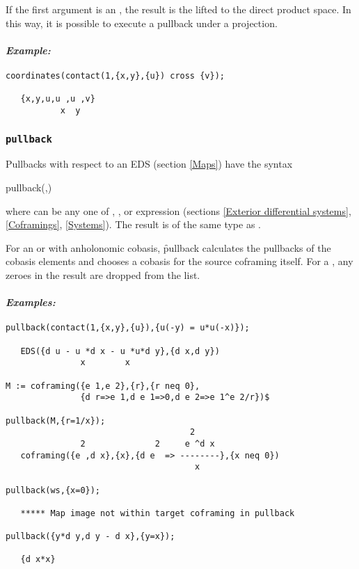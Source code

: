 If the first argument is an , the result is the 
lifted to the direct product space. In this way, it is possible to
execute a pullback under a projection. 

\paragraph{\it Example:}
\begin{verbatim}
coordinates(contact(1,{x,y},{u}) cross {v});

   {x,y,u,u ,u ,v}
           x  y 
\end{verbatim}

\subsubsection{\tt pullback}
\label{pullback}

Pullbacks with respect to an EDS  (section \ref{Maps}) have the
syntax
\begin{edssyntax}
	pullback(,)
\end{edssyntax}
where  can be any one of , ,
 or  expression (sections \ref{Exterior
differential systems}, \ref{Coframings}, \ref{Systems}). The result is of
the same type as .

For an  or  with anholonomic cobasis, \f{pullback}
calculates the pullbacks of the cobasis elements and chooses a cobasis for
the source coframing itself. For a , any zeroes in the result
are dropped from the list.

\paragraph{\it Examples:}
\begin{verbatim}
pullback(contact(1,{x,y},{u}),{u(-y) = u*u(-x)});

   EDS({d u - u *d x - u *u*d y},{d x,d y})
               x        x 

M := coframing({e 1,e 2},{r},{r neq 0},
               {d r=>e 1,d e 1=>0,d e 2=>e 1^e 2/r})$

pullback(M,{r=1/x});
                                     2
               2              2     e ^d x
   coframing({e ,d x},{x},{d e  => --------},{x neq 0})
                                      x 

pullback(ws,{x=0});

   ***** Map image not within target coframing in pullback  

pullback({y*d y,d y - d x},{y=x});

   {d x*x}
\end{verbatim}

